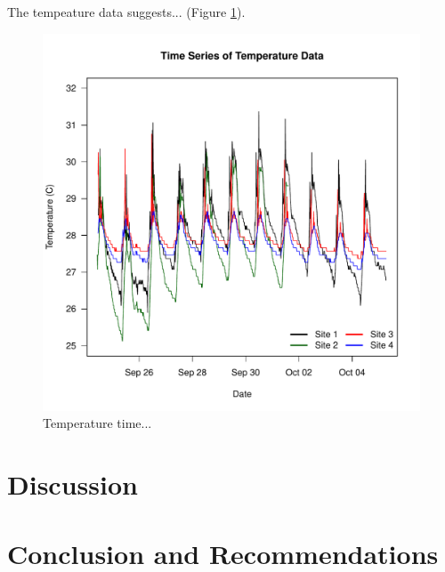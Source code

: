\documentclass{article}\usepackage[]{graphicx}\usepackage[]{color}
\begin{document}
The tempeature data suggests... (Figure \ref{Temp}).

\begin{figure}
\includegraphics{Figures/Temp}
\caption{Temperature time...}
\label{Temp}
\end{figure}

\section{Discussion}


\section{Conclusion and Recommendations}
\end{document}
